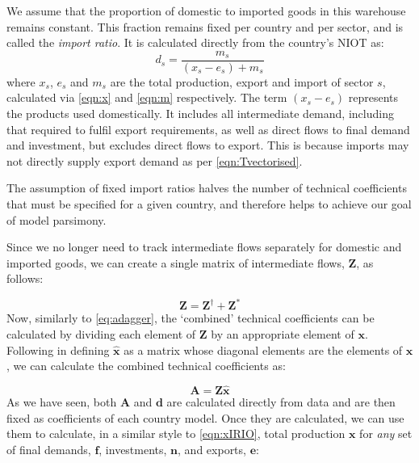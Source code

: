 \documentclass[a4paper]{article}
\begin{document}
We assume that the proportion of domestic to imported goods in this warehouse remains constant.
This fraction remains fixed per country and per sector, and is called the \textit{import ratio}. It is calculated directly from the country's NIOT as:
\begin{equation}\label{eqn:importratio}
d_s = \frac{m_s}{(x_s - e_s ) + m_s}
\end{equation}
where $x_s$, $e_s$ and $m_s$ are the total production, export and import of sector $s$, calculated via \cref{eqn:x} and \cref{eqn:m} respectively.
The term $(x_s - e_s )$ represents the products used domestically.
It includes all intermediate demand, including that required to fulfil export requirements, as well as direct flows to final demand and investment, but excludes direct flows to export.
This is because imports may not directly supply export demand as per \cref{eqn:Tvectorised}.

The assumption of fixed import ratios halves the number of technical coefficients that must be specified for a given country, and therefore helps to achieve our goal of model parsimony.

Since we no longer need to track intermediate flows separately for domestic and imported goods, we can create a single matrix of intermediate flows, $\boldsymbol{Z}$, as follows:

\begin{equation}
    \boldsymbol{Z} = \boldsymbol{Z}^{\dagger} + \boldsymbol{Z}^{*}
\end{equation}
Now, similarly to \cref{eq:adagger}, the `combined' technical coefficients can be calculated by dividing each element of $\boldsymbol{Z}$ by an appropriate element of $\boldsymbol{x}$.
Following \textcite{miller_input-output_1985} in defining $\boldsymbol{\hat{x}}$ as a matrix whose diagonal elements are the elements of $\boldsymbol{x}$, we can calculate the combined technical coefficients as:

\begin{equation}\label{eqn:a_combined}
    \boldsymbol{A} = \boldsymbol{Z} \boldsymbol{\hat{x}}
\end{equation}
As we have seen, both $\boldsymbol{A}$ and $\boldsymbol{d}$ are calculated directly from data and are then fixed as coefficients of each country model. Once they are calculated, we can use them to calculate, in a similar style to \cref{eqn:xIRIO}, total production $\boldsymbol{x}$ for \textit{any} set of final demands, $\boldsymbol{f}$, investments, $\boldsymbol{n}$, and exports, $\boldsymbol{e}$: 
\end{document}

